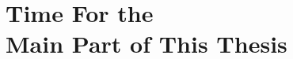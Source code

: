 \hypertarget{part:PartII}{
    \part[Time For the Main Part of This Thesis]%
    {Time For the \\Main Part of This Thesis}}
\thispagestyle{empty}
